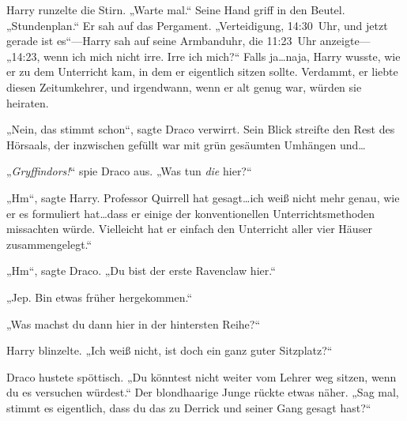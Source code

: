 Harry runzelte die Stirn. „Warte mal.“ Seine Hand griff in den Beutel. „Stundenplan.“ Er sah auf das Pergament. „Verteidigung, 14:30~Uhr, und jetzt gerade ist es“—Harry sah auf seine Armbanduhr, die 11:23~Uhr anzeigte— „14:23, wenn ich mich nicht irre. Irre ich mich?“ Falls ja…naja, Harry wusste, wie er zu dem Unterricht kam, in dem er eigentlich sitzen sollte. Verdammt, er liebte diesen Zeitumkehrer, und irgendwann, wenn er alt genug war, würden sie heiraten.

„Nein, das stimmt schon“, sagte Draco verwirrt. Sein Blick streifte den Rest des Hörsaals, der inzwischen gefüllt war mit grün gesäumten Umhängen und…

„\emph{Gryffindors!}“ spie Draco aus. „Was tun \emph{die} hier?“

„Hm“, sagte Harry. Professor Quirrell hat gesagt…ich weiß nicht mehr genau, wie er es formuliert hat…dass er einige der konventionellen Unterrichtsmethoden missachten würde. Vielleicht hat er einfach den Unterricht aller vier Häuser zusammengelegt.“

„Hm“, sagte Draco. „Du bist der erste Ravenclaw hier.“

„Jep. Bin etwas früher hergekommen.“

„Was machst du dann hier in der hintersten Reihe?“

Harry blinzelte. „Ich weiß nicht, ist doch ein ganz guter Sitzplatz?“

Draco hustete spöttisch. „Du könntest nicht weiter vom Lehrer weg sitzen, wenn du es versuchen würdest.“ Der blondhaarige Junge rückte etwas näher. „Sag mal, stimmt es eigentlich, dass du das zu Derrick und seiner Gang gesagt hast?“

